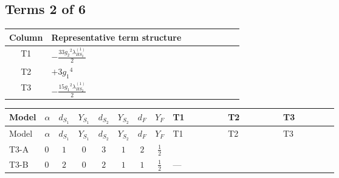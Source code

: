 \documentclass[8pt]{article}
\begin{document}
\begin{landscape}
\subsection*{Terms 2 of 6}
\begin{center}
\begin{tabular}{@{}c >{\raggedright\arraybackslash}p{0.82\linewidth}@{}}
\toprule
Column & Representative term structure \\
\midrule
T1 & \(\displaystyle -\frac{33 {g_2}^2 {\lambda_{HS_2}^{(1)}}}{2}\) \\
\midrule
T2 & \(\displaystyle +3 {g_1}^4\) \\
\midrule
T3 & \(\displaystyle -\frac{15 {g_1}^2 {\lambda_{HS_2}^{(1)}}}{2}\) \\
\midrule
\bottomrule
\end{tabular}
\end{center}
\smallskip
\tiny
\begin{longtable}{@{}llcccccc >{\raggedright\arraybackslash}p{0.21\linewidth} >{\raggedright\arraybackslash}p{0.21\linewidth} >{\raggedright\arraybackslash}p{0.21\linewidth}@{}}
\toprule
Model & $\alpha$ & $d_{S_1}$ & $Y_{S_1}$ & $d_{S_2}$ & $Y_{S_2}$ & $d_F$ & $Y_F$ & T1 & T2 & T3 \\
\midrule
\endfirsthead
\toprule
Model & $\alpha$ & $d_{S_1}$ & $Y_{S_1}$ & $d_{S_2}$ & $Y_{S_2}$ & $d_F$ & $Y_F$ & T1 & T2 & T3 \\
\midrule
\endhead
T3-A & $0$ & $1$ & $0$ & $3$ & $1$ & $2$ & $\frac{1}{2}$ & \scriptsize\adjustbox{max width=\linewidth}{$\begin{gathered} -\frac{33 {g_2}^2 {\lambda_{HS_2}^{(1)}}}{2}\end{gathered}$} & \scriptsize\adjustbox{max width=\linewidth}{$\begin{gathered} +3 {g_1}^4\end{gathered}$} & \scriptsize\adjustbox{max width=\linewidth}{$\begin{gathered} -\frac{15 {g_1}^2 {\lambda_{HS_2}^{(1)}}}{2}\end{gathered}$} \\
\midrule
T3-B & $0$ & $2$ & $0$ & $2$ & $1$ & $1$ & $\frac{1}{2}$ & --- & \scriptsize\adjustbox{max width=\linewidth}{$\begin{gathered} +3 {g_1}^4\end{gathered}$} & \scriptsize\adjustbox{max width=\linewidth}{$\begin{gathered} -\frac{15 {g_1}^2 {\lambda_{HS_2}^{(1)}}}{2}\end{gathered}$} \\

\end{longtable}
\end{landscape}
\end{document}
